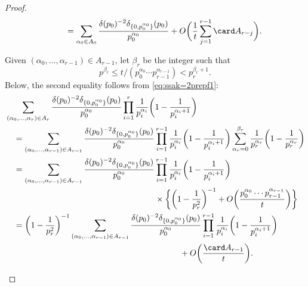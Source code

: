 \documentclass[12pt, reqno, twoside, letterpaper]{amsart}
\begin{document}
\begin{jetsam}
\begin{proof}
\begin{align}
\begin{split}
 & \hspace{30pt} =
   \sum_{\alpha_0 \in A_0}
    \frac{\delta(p_0)^{-2}\delta_{\{0,p_0^{\alpha_0}\}}(p_0)}{p_0^{\alpha_0}}
     +
      O\bigg(\frac{1}{t}\sum_{j = 1}^{r - 1} \card A_{r - j}\bigg).
 \end{split}
\end{align}
%
\begin{nixnix}
Given $(\alpha_0,\ldots,\alpha_{r - 1}) \in A_{r - 1}$, let 
$\beta_r$ be the integer such that 
\[
 p^{\beta_r} 
  \le t/(p_0^{\alpha_0}\cdots p_{r - 1}^{\alpha_{r-1}}) 
   < p_r^{\beta_r + 1}.
\]
%
Below, the second equality follows from 
\eqref{eq:ssak=2prepf1}:  
\begin{align*}
 & 
 \sum_{(\alpha_0,\ldots,\alpha_r) \in A_r}
  \frac{\delta(p_0)^{-2}\delta_{\{0,p_0^{\alpha_0}\}}(p_0)}{p_0^{\alpha_0}}
   \prod_{i = 1}^r 
    \frac{1}{p_i^{\alpha_i}}
     \bigg(1 - \frac{1}{p_i^{\alpha_i + 1}}\bigg)
 \\
 & \hspace{10pt} = 
  \sum_{(\alpha_0,\ldots,\alpha_{r-1}) \in A_{r-1}}
   \frac{\delta(p_0)^{-2}\delta_{\{0,p_0^{\alpha_0}\}}(p_0)}{p_0^{\alpha_0}}
    \prod_{i = 1}^{r - 1} 
     \frac{1}{p_i^{\alpha_i}}
      \bigg(1 - \frac{1}{p_i^{\alpha_i + 1}}\bigg)
       \sum_{\alpha_r = 0}^{\beta_r}
        \frac{1}{p_r^{\alpha_r}}
         \bigg(1 - \frac{1}{p_r^{\alpha_r}}\bigg)
 \\
 & \hspace{10pt} = 
  \sum_{(\alpha_0,\ldots,\alpha_{r-1}) \in A_{r-1}}
   \frac{\delta(p_0)^{-2}\delta_{\{0,p_0^{\alpha_0}\}}(p_0)}{p_0^{\alpha_0}}
    \prod_{i = 1}^{r - 1} 
     \frac{1}{p_i^{\alpha_i}}
      \bigg(1 - \frac{1}{p_i^{\alpha_i + 1}}\bigg)
 \\
 & \hspace{180pt} \times 
       \bigg\{
        \bigg(1 - \frac{1}{p_r^2}\bigg)^{-1}
          + O\bigg(\frac{p_0^{\alpha_0}\cdots p_{r-1}^{\alpha_{r-1}}}{t} \bigg)
       \bigg\}
 \\
 & \hspace{10pt} =
    \bigg(1 - \frac{1}{p_r^2}\bigg)^{-1}
     \sum_{(\alpha_0,\ldots,\alpha_{r-1}) \in A_{r-1}}
      \frac{\delta(p_0)^{-2}\delta_{\{0,p_0^{\alpha_0}\}}(p_0)}{p_0^{\alpha_0}}
       \prod_{i = 1}^{r - 1} 
        \frac{1}{p_i^{\alpha_i}}
         \bigg(1 - \frac{1}{p_i^{\alpha_i + 1}}\bigg)
 \\
 & \hspace{210pt} + 
           O\bigg(\frac{\card A_{r-1}}{t}\bigg).
\end{align*}

\end{nixnix}
\end{proof}
\end{jetsam}
\end{document}
